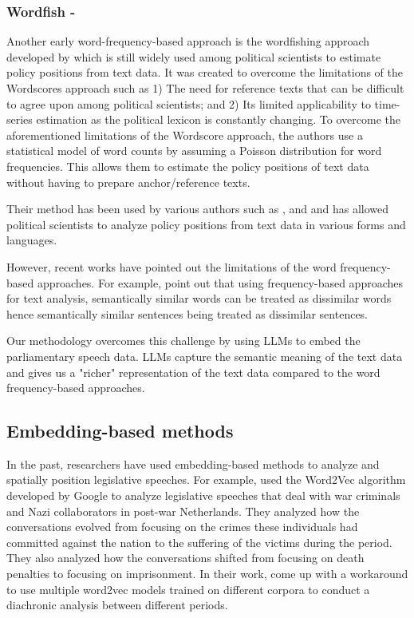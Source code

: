 \documentclass[final,5p,times,twocolumn,authoryear]{elsarticle}
\begin{document}
\subsubsection{Wordfish - \citealt{wordfishing}}
Another early word-frequency-based approach is the wordfishing approach developed by \citeauthor{wordfishing} which is still widely used among political scientists to estimate policy positions from text data. It was created to overcome the limitations of the Wordscores approach such as 1) The need for reference texts that can be difficult to agree upon among political scientists; and 2) Its limited applicability to time-series estimation as the political lexicon is constantly changing. 
To overcome the aforementioned limitations of the Wordscore approach, the authors use a statistical model of word counts by assuming a Poisson distribution for word frequencies. This allows them to estimate the policy positions of text data without having to prepare anchor/reference texts. 

Their method has been used by various authors such as \citeauthor{sharks-minnows},\citeauthor{Curini_Hino_Osaka_2020} and \citeauthor{CATALINAC_2018} and has allowed political scientists to analyze policy positions from text data in various forms and languages.

However, recent works have pointed out the limitations of the word frequency-based approaches. For example, \citeauthor{Political-Text-Scaling-Meets-Computational-Semantics} point out that using frequency-based approaches for text analysis, semantically similar words can be treated as dissimilar words hence semantically similar sentences being treated as dissimilar sentences.

Our methodology overcomes this challenge by using LLMs to embed the parliamentary speech data. LLMs capture the semantic meaning of the text data and gives us a "richer" representation of the text data compared to the word frequency-based approaches.

\subsection{Embedding-based methods}
In the past, researchers have used embedding-based methods to analyze and spatially position legislative speeches. For example, \citeauthor{Debating-Evil:-Using-Word-Embeddings-to-Analyze-Parliamentary-Debates} used the Word2Vec algorithm developed by Google to analyze legislative speeches that deal with war criminals and Nazi collaborators in post-war Netherlands. They analyzed how the conversations evolved from focusing on the crimes these individuals had committed against the nation to the suffering of the victims during the period. They also analyzed how the conversations shifted from focusing on death penalties to focusing on imprisonment. In their work, \citeauthor{Debating-Evil:-Using-Word-Embeddings-to-Analyze-Parliamentary-Debates} come up with a workaround to use multiple word2vec models trained on different corpora to conduct a diachronic analysis between different periods. 
\end{document}
